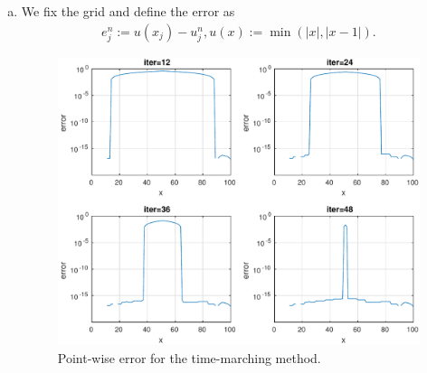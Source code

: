 \documentclass[10pt,a4paper,twoside, french]{article}
\numberwithin{equation}{section}
\numberwithin{figure}{section}
\numberwithin{table}{section}
\begin{document}
\begin{enumerate}
\begin{enumerate}[a.]
\item We fix the grid and define the error as 
\begin{align*}
e_j^ n:=u(x_j)-u_j^n, u(x):= \min(|x|,|x-1|). 
\end{align*}
\begin{figure}[h]
\centering
\includegraphics[scale=.7]{fig/task1_error}
\caption{Point-wise error for the time-marching method.}
\label{fig:task1_err}
\end{figure}


\end{enumerate}
\end{enumerate}
\end{document}

